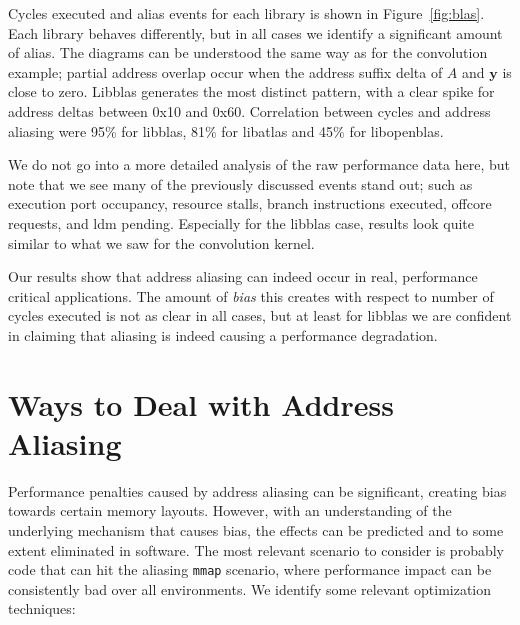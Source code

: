 \documentclass[10pt, conference, compsocconf]{IEEEtran}
\begin{document}
Cycles executed and alias events for each library is shown in Figure~\ref{fig:blas}.
Each library behaves differently, but in all cases we identify a significant amount of alias. 
The diagrams can be understood the same way as for the convolution example; partial address overlap occur when the address suffix delta of $A$ and $\boldsymbol{y}$ is close to zero.
Libblas generates the most distinct pattern, with a clear spike for address deltas between 0x10 and 0x60.
Correlation between cycles and address aliasing were 95\% for libblas, 81\% for libatlas and 45\% for libopenblas.

We do not go into a more detailed analysis of the raw performance data here, but note that we see many of the previously discussed events stand out; such as execution port occupancy, resource stalls, branch instructions executed, offcore requests, and ldm pending.
Especially for the libblas case, results look quite similar to what we saw for the convolution kernel.

Our results show that address aliasing can indeed occur in real, performance critical applications.
The amount of \emph{bias} this creates with respect to number of cycles executed is not as clear in all cases, but at least for libblas we are confident in claiming that aliasing is indeed causing a performance degradation.


\section{Ways to Deal with Address Aliasing}
\label{sec:mitigation}
Performance penalties caused by address aliasing can be significant, creating bias towards certain memory layouts.
However, with an understanding of the underlying mechanism that causes bias, the effects can be predicted and to some extent eliminated in software.
The most relevant scenario to consider is probably code that can hit the aliasing \texttt{mmap} scenario, where performance impact can be consistently bad over all environments.
We identify some relevant optimization techniques:
\end{document}
